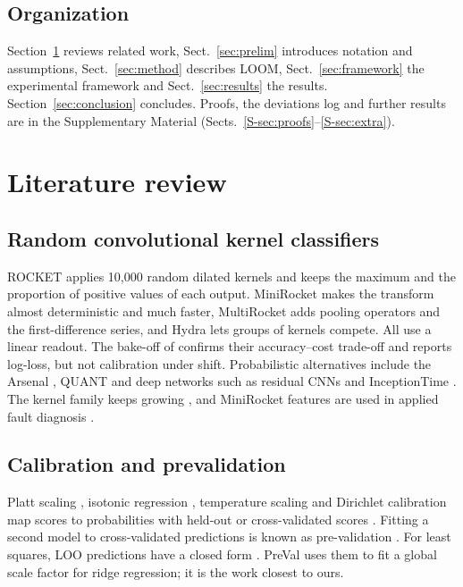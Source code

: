 \documentclass[preprint,12pt,authoryear]{elsarticle}
\begin{document}
\subsection{Organization}
Section~\ref{sec:lit} reviews related work, Sect.~\ref{sec:prelim} introduces notation and assumptions, Sect.~\ref{sec:method} describes LOOM, Sect.~\ref{sec:framework} the experimental framework and Sect.~\ref{sec:results} the results. Section~\ref{sec:conclusion} concludes. Proofs, the deviations log and further results are in the Supplementary Material (Sects.~\ref{S-sec:proofs}--\ref{S-sec:extra}).

\section{Literature review}\label{sec:lit}

\subsection{Random convolutional kernel classifiers}
ROCKET \citep{dempster2020rocket} applies 10{,}000 random dilated kernels and keeps the maximum and the proportion of positive values of each output. MiniRocket \citep{dempster2021minirocket} makes the transform almost deterministic and much faster, MultiRocket \citep{tan2022multirocket} adds pooling operators and the first-difference series, and Hydra \citep{dempster2023hydra} lets groups of kernels compete. All use a linear readout. The bake-off of \citet{middlehurst2024bakeoff} confirms their accuracy--cost trade-off and reports log-loss, but not calibration under shift. Probabilistic alternatives include the Arsenal \citep{middlehurst2021hc2}, QUANT \citep{dempster2024quant} and deep networks such as residual CNNs \citep{wang2017baseline} and InceptionTime \citep{ismailfawaz2020inception}. The kernel family keeps growing \citep{wang2025kernelgroup}, and MiniRocket features are used in applied fault diagnosis \citep{takara2025minirocket}.

\subsection{Calibration and prevalidation}
Platt scaling \citep{platt1999}, isotonic regression \citep{niculescu2005,zadrozny2002}, temperature scaling \citep{guo2017} and Dirichlet calibration \citep{kull2019} map scores to probabilities with held-out or cross-validated scores \citep{silvafilho2023}. Fitting a second model to cross-validated predictions is known as pre-validation \citep{tibshirani2002}. For least squares, LOO predictions have a closed form \citep{allen1974,cawley2004,golub1979}. PreVal \citep{dempster2025preval} uses them to fit a global scale factor for ridge regression; it is the work closest to ours.
\end{document}
